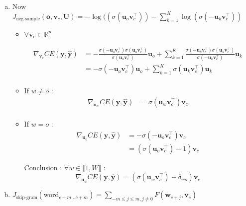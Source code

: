 \documentclass[19pt]{extarticle}
\begin{document}
\begin{enumerate}[a)]
\item Now $J_{\text{neg-sample}}(\bm{o}, \bm{v}_c, \bm{U}) = - \log((\sigma(\bm{u}_o\bm{v}_c^{\top}))
- \sum_{k=1}^K\log(\sigma(-\bm{u}_k\bm{v}_c^{\top}))$
\begin{itemize}
\item  $\forall \bm{ v}_c \in \mathds{R}^n$

\begin{equation*}\begin{split}
\nabla_{\bm{v}_c}CE(\bm{y}, \hat{\bm{y}}) &=-\frac{\sigma(-\bm{u}_o\bm{v}_c^{\top})\sigma(\bm{u}_o\bm{v}_c^{\top})}{\sigma(\bm{u}_o\bm{v}_c^{\top})}\bm{u}_o + \sum_{k=1}^K\frac{\sigma(-\bm{u}_k\bm{v}_c^{\top})\sigma(\bm{u}_k\bm{v}_c^{\top})}{\sigma(-\bm{u}_k\bm{v}_c^{\top})}\bm{u}_k\\
&=-\sigma(-\bm{u}_o\bm{v}_c^{\top})\bm{u}_o + \sum_{k=1}^K\sigma(\bm{u}_k\bm{v}_c^{\top})\bm{u}_k\\
\end{split}\end{equation*}

\item If $w \neq o$ : 
\begin{equation*}\begin{split}
\nabla_{\bm{u}_w}CE(\bm{y}, \hat{\bm{y}})&= \sigma(\bm{u}_w\bm{v}_c^{\top})\bm{v}_c\\
\end{split}\end{equation*}

\item If $w = o$ : 
\begin{equation*}\begin{split}
\nabla_{\bm{u}_o}CE(\bm{y}, \hat{\bm{y}})&= -\sigma(-\bm{u}_o\bm{v}_c^{\top})\bm{v}_c\\
&= (\sigma(\bm{u}_o\bm{v}_c^{\top}) -1)\bm{v}_c
\end{split}\end{equation*}

Conclusion : $\forall w \in \llbracket1, W \rrbracket$ : 
$$\nabla_{\bm{u}_w}CE(\bm{y}, \hat{\bm{y}}) =  (\sigma(\bm{u}_w\bm{v}_c^{\top}) -\delta_{wo})\bm{v}_c$$


\end{itemize}


\item $J_{\text{skip-gram}}(\text{word}_{c-m...c+m}) = \sum_{-m\leq j\leq m,j\neq 0}F(\bm{w}_{c+j} , \bm{v}_c)$


\end{enumerate}
\end{document}
